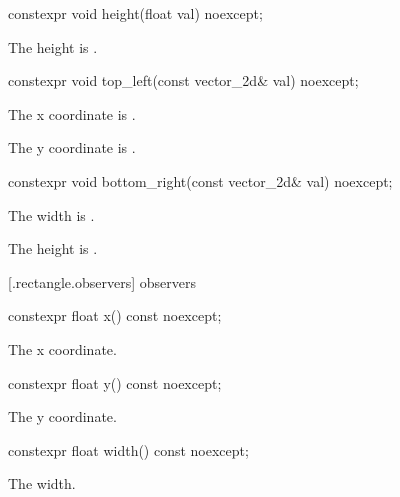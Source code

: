 %
\begin{itemdecl}
constexpr void height(float val) noexcept;
\end{itemdecl}
\begin{itemdescr}
\pnum
\effects
The height is .
\end{itemdescr}

%
\begin{itemdecl}
constexpr void top_left(const vector_2d& val) noexcept;
\end{itemdecl}
\begin{itemdescr}
\pnum
\effects
The x coordinate is .

\effects
The y coordinate is .
\end{itemdescr}

%
\begin{itemdecl}
constexpr void bottom_right(const vector_2d& val) noexcept;
\end{itemdecl}
\begin{itemdescr}
\pnum
\effects
The width is .

\pnum
The height is .
\end{itemdescr}

 [\iotwod.rectangle.observers]{ observers}

%
\begin{itemdecl}
constexpr float x() const noexcept;
\end{itemdecl}
\begin{itemdescr}
\pnum
\returns
The x coordinate.
\end{itemdescr}

%
\begin{itemdecl}
constexpr float y() const noexcept;
\end{itemdecl}
\begin{itemdescr}
\pnum
\returns
The y coordinate.
\end{itemdescr}

%
\begin{itemdecl}
constexpr float width() const noexcept;
\end{itemdecl}
\begin{itemdescr}
\pnum
\returns
The width.
\end{itemdescr}

